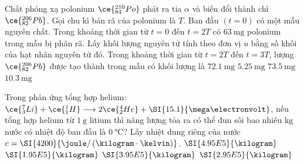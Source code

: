 \begin{ex}
	Chất phóng xạ polonium $\ce{^{210}_{84}Po}$ phát ra tia $\alpha$ và biến đổi thành chì $\ce{^{206}_{82}Pb}$. Gọi chu kì bán rã của polonium là $T$. Ban đầu $\left(t=0\right)$ có một mẫu nguyên chất. Trong khoảng thời gian từ $t=0$ đến $t=2T$ có $\SI{63}{\milli\gram}$ polonium trong mẫu bị phân rã. Lấy khối lượng nguyên tử tính theo đơn vị $\si{u}$ bằng số khối của hạt nhân nguyên tử đó. Trong khoảng thời gian từ $t=2T$ đến $t=3T$, lượng $\ce{^{206}_{82}Pb}$ được tạo thành trong mẫu có khối lượng là
	\choice
	{$\SI{72.1}{\milli\gram}$}
	{$\SI{5.25}{\milli\gram}$}
	{$\SI{73.5}{\milli\gram}$}
	{\True $\SI{10.3}{\milli\gram}$}
\end{ex}
\begin{ex}
Trong phản ứng tổng hợp helium: $\ce{^7_3Li}+\ce{^1_1H}\longrightarrow2 \ce{^4_2He}+\SI{15.1}{\mega\electronvolt}$, nếu tổng hợp helium từ $\SI{1}{\gram}$ litium thì năng lượng tỏa ra có thể đun sôi bao nhiêu $\si{\kilo\gram}$ nước có nhiệt độ ban đầu là $\SI{0}{\celsius}$? Lấy nhiệt dung riêng của nước $c=\SI{4200}{\joule/\left(\kilogram\cdot\kelvin\right)}$.	
	\choice
	{\True $\SI{4.95E5}{\kilogram}$}
	{$\SI{1.95E5}{\kilogram}$}
	{$\SI{3.95E5}{\kilogram}$}
	{$\SI{2.95E5}{\kilogram}$}
\end{ex}
